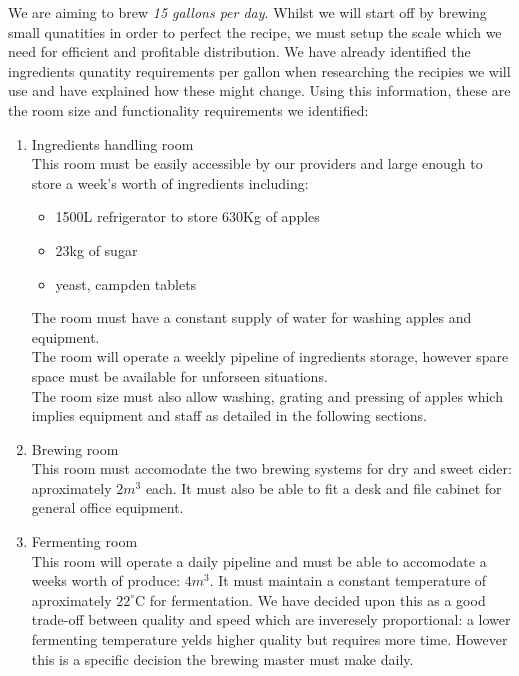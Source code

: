 \documentclass[11pt]{article}
\begin{document}
We are aiming to brew \emph{15 gallons per day}. Whilst we will start off by brewing small qunatities in order to perfect the recipe, we must setup the scale which we need for efficient and profitable distribution. We have already identified the ingredients qunatity requirements per gallon when researching the recipies we will use and have explained how these might change. Using this information, these are the room size and functionality requirements we identified: \\

  \begin{enumerate}
  \item Ingredients handling room \\
  This room must be easily accessible by our providers and large enough to store a week's worth of ingredients including:
    \begin{itemize}
    \item 1500L refrigerator to store 630Kg of apples
    \item 23kg of sugar
    \item yeast, campden tablets
    \end{itemize}
  The room must have a constant supply of water for washing apples and equipment. \\
  The room will operate a weekly pipeline of ingredients storage, however spare space must be available for unforseen situations.\\
  The room size must also allow washing, grating and pressing of apples which implies equipment and staff as detailed in the following sections.

  \item Brewing room \\
  This room must accomodate the two brewing systems for dry and sweet cider: aproximately $2m^3$ each. It must also be able to fit a desk and file cabinet for general office equipment.
  \item Fermenting room \\
  This room will operate a daily pipeline and must be able to accomodate a weeks worth of produce: $4m^3$. It must maintain a constant temperature of aproximately $22^\circ$C for fermentation. We have decided upon this as a good trade-off between quality and speed which are inveresely proportional: a lower fermenting temperature yelds higher quality but requires more time. However this is a specific decision the brewing master must make daily.


\end{enumerate}
\end{document}
